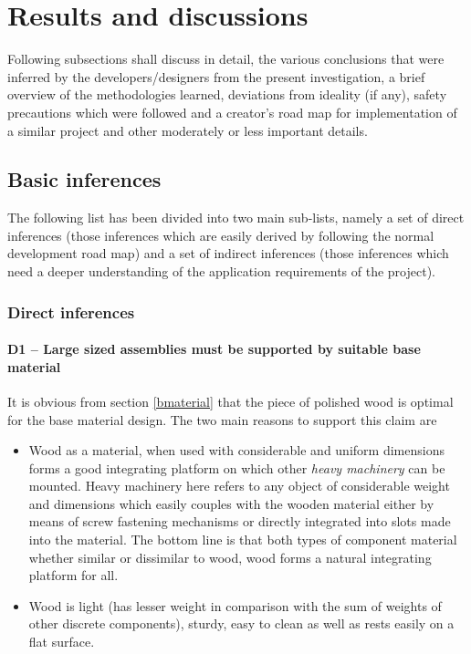 \chapter{Results and discussions} \label{chapter6}

Following subsections shall discuss in detail, the various conclusions that were inferred by the developers/designers from the present investigation, a brief overview of the methodologies learned, deviations from ideality (if any), safety precautions which were followed and a creator’s road map for implementation of a similar project and other moderately or less important details.


\section{Basic inferences}

The following list has been divided into two main sub-lists, namely a set of direct inferences (those inferences which are easily derived by following the normal development road map) and a set of indirect inferences (those inferences which need a deeper understanding of the application requirements of the project).

\subsection{Direct inferences}

\subsubsection*{D1 – Large sized assemblies must be supported by suitable base material}

It is obvious from section \ref{bmaterial} that the piece of polished wood is optimal for the base material design. The two main reasons to support this claim are

\begin{itemize}
 \item Wood as a material, when used with considerable and uniform dimensions forms a good integrating platform on which other \textit{heavy machinery} can be mounted. Heavy machinery here refers to any object of considerable weight and dimensions which easily couples with the wooden material either by means of screw fastening mechanisms or directly integrated into slots made into the material. The bottom line is that both types of component material whether similar or dissimilar to wood, wood forms a natural integrating platform for all.
 \item Wood is light (has lesser weight in comparison with the sum of weights of other discrete components), sturdy, easy to clean as well as rests easily on a flat surface.
\end{itemize}

